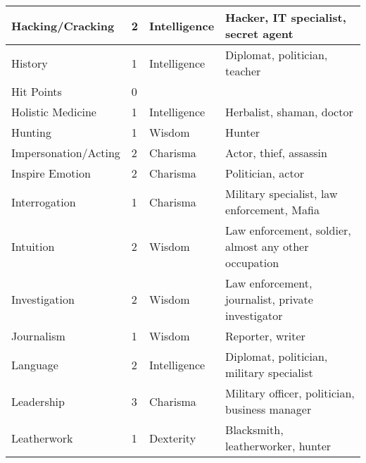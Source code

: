 \documentclass[twoside]{book}
\begin{document}
\begin{longtable}{p{1.25in}llp{12em}}
  \raggedright
           Hacking/Cracking 
  &
   2 
  &
   Intelligence 
  &
   Hacker, IT specialist,
           secret agent 
  \tabularnewline
  \hline
      
  \raggedright
           History 
  &
   1 
  &
   Intelligence 
  &
   Diplomat, politician,
           teacher 
  \tabularnewline
  \hline
      
  \raggedright
           Hit Points 
  &
   0 
  &
  
  \tabularnewline
  \hline
      
  \raggedright
           Holistic Medicine 
  &
   1 
  &
   Intelligence 
  &
   Herbalist, shaman, doctor
           
  \tabularnewline
  \hline
      
  \raggedright
           Hunting 
  &
   1 
  &
   Wisdom 
  &
   Hunter 
  \tabularnewline
  \hline
      
  \raggedright
           Impersonation/Acting 
  &
   2 
  &
   Charisma 
  &
   Actor, thief, assassin
           
  \tabularnewline
  \hline
      
  \raggedright
           Inspire Emotion 
  &
   2 
  &
   Charisma 
  &
   Politician, actor
           
  \tabularnewline
  \hline
      
  \raggedright
           Interrogation 
  &
   1 
  &
   Charisma 
  &
   Military specialist, law
           enforcement, Mafia 
  \tabularnewline
  \hline
      
  \raggedright
           Intuition 
  &
   2 
  &
   Wisdom 
  &
   Law enforcement, soldier,
           almost any other occupation 
  \tabularnewline
  \hline
      
  \raggedright
           Investigation 
  &
   2 
  &
   Wisdom 
  &
   Law enforcement,
           journalist, private investigator 
  \tabularnewline
  \hline
      
  \raggedright
           Journalism 
  &
   1 
  &
   Wisdom 
  &
   Reporter, writer 
  \tabularnewline
  \hline
      
  \raggedright
           Language 
  &
   2 
  &
   Intelligence 
  &
   Diplomat, politician,
           military specialist 
  \tabularnewline
  \hline
      
  \raggedright
           Leadership 
  &
   3 
  &
   Charisma 
  &
   Military officer,
           politician, business manager 
  \tabularnewline
  \hline
      
  \raggedright
           Leatherwork 
  &
   1 
  &
   Dexterity 
  &
   Blacksmith,
           leatherworker, hunter 
  \tabularnewline
  \hline
      

\end{longtable}
\end{document}
